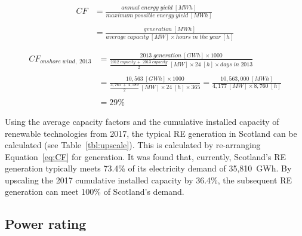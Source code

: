 







	\begin{equation}\label{eq:CF}
		\begin{split}
			CF & = \frac{annual\;energy\;yield\;[MWh]}{maximum\;possible\;energy\;yield\;[MWh]} \\
			& \\
			& = \frac{generation\;[MWh]}{average\;capacity\;[MW] \times hours\;in\;the\;year\;[h]}
		\end{split}
	\end{equation}

	\begin{equation}\label{eq:CF_example}
		\begin{split}
			CF_{onshore\;wind,\;2013} & = \frac{2013\;generation\;[GWh] \times 1000}{\frac{2012\;capacity\;+\;2013\;capacity}{2}\;[MW] \times 24\;[h] \times days\;in\;2013} \\
			& \\
			& = \frac{10,563\;[GWh] \times 1000}{\frac{3,765\;+\;4,589}{2}\;[MW] \times 24\;[h] \times 365} = \frac{10,563,000\;[MWh]}{4,177\;[MW] \times 8,760\;[h]} \\
			& \\
			& = 29\%
		\end{split}
	\end{equation}

Using the average capacity factors and the cumulative installed capacity of renewable technologies from 2017, the typical RE generation in Scotland can be calculated (see Table~\ref{tbl:upscale}).
This is calculated by re-arranging Equation~\ref{eq:CF} for generation.
It was found that, currently, Scotland's RE generation typically meets 73.4\% of its electricity demand of 35,810~GWh.
By upscaling the 2017 cumulative installed capacity by 36.4\%, the subsequent RE generation can meet 100\% of Scotland's demand.






\subsection{Power rating}



